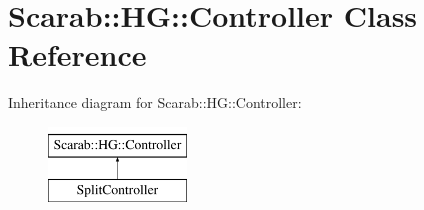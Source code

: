 \hypertarget{class_scarab_1_1_h_g_1_1_controller}{
\section{Scarab::HG::Controller Class Reference}
\label{class_scarab_1_1_h_g_1_1_controller}
}
Inheritance diagram for Scarab::HG::Controller:\begin{figure}[H]
\begin{center}
\leavevmode
\includegraphics[height=2cm]{class_scarab_1_1_h_g_1_1_controller}
\end{center}
\end{figure}
